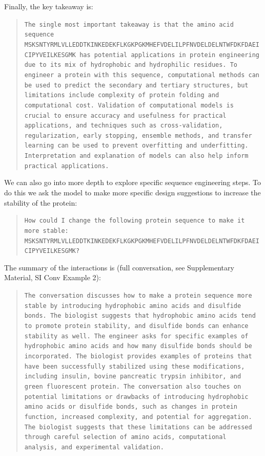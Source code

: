 Finally, the key takeaway is:
\begin{quote}
\small\texttt{The single most important takeaway is that the amino acid sequence MSKSNTYRMLVLLEDDTKINKEDEKFLKGKPGKMHEFVDELILPFNVDELDELNTWFDKFDAEICIPYVEILKESGMK has potential applications in protein engineering due to its mix of hydrophobic and hydrophilic residues. To engineer a protein with this sequence, computational methods can be used to predict the secondary and tertiary structures, but limitations include complexity of protein folding and computational cost. Validation of computational models is crucial to ensure accuracy and usefulness for practical applications, and techniques such as cross-validation, regularization, early stopping, ensemble methods, and transfer learning can be used to prevent overfitting and underfitting. Interpretation and explanation of models can also help inform practical applications.}
\end{quote}

We can also go into more depth to explore specific sequence engineering steps. To do this we ask the model to make more specific design suggestions to increase the stability of the protein:

\begin{quote}
\small\texttt{How could I change the following protein sequence to make it more stable: MSKSNTYRMLVLLEDDTKINKEDEKFLKGKPGKMHEFVDELILPFNVDELDELNTWFDKFDAEICIPYVEILKESGMK?
}
\end{quote}

The summary of the interactions is (full conversation, see Supplementary Material, SI Conv Example 2):
\begin{quote}
\small\texttt{The conversation discusses how to make a protein sequence more stable by introducing hydrophobic amino acids and disulfide bonds. The biologist suggests that hydrophobic amino acids tend to promote protein stability, and disulfide bonds can enhance stability as well. The engineer asks for specific examples of hydrophobic amino acids and how many disulfide bonds should be incorporated. The biologist provides examples of proteins that have been successfully stabilized using these modifications, including insulin, bovine pancreatic trypsin inhibitor, and green fluorescent protein. The conversation also touches on potential limitations or drawbacks of introducing hydrophobic amino acids or disulfide bonds, such as changes in protein function, increased complexity, and potential for aggregation. The biologist suggests that these limitations can be addressed through careful selection of amino acids, computational analysis, and experimental validation.}
\end{quote}


